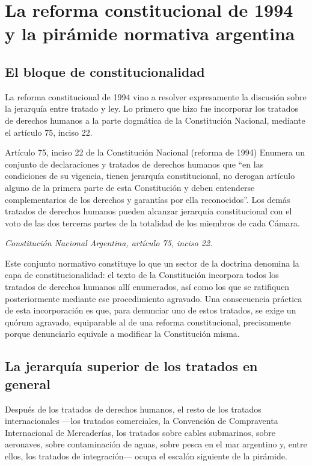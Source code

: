 \documentclass[12pt,oneside]{book}
\begin{document}
\section{La reforma constitucional de 1994 y la pirámide normativa argentina}

\subsection{El bloque de constitucionalidad}

La reforma constitucional de 1994 vino a resolver expresamente la discusión sobre la jerarquía entre tratado y ley. Lo primero que hizo fue incorporar los tratados de derechos humanos a la parte dogmática de la Constitución Nacional, mediante el artículo 75, inciso 22.

\begin{definition}{Artículo 75, inciso 22 de la Constitución Nacional (reforma de 1994)}
Enumera un conjunto de declaraciones y tratados de derechos humanos que ``en las condiciones de su vigencia, tienen jerarquía constitucional, no derogan artículo alguno de la primera parte de esta Constitución y deben entenderse complementarios de los derechos y garantías por ella reconocidos''. Los demás tratados de derechos humanos pueden alcanzar jerarquía constitucional con el voto de las dos terceras partes de la totalidad de los miembros de cada Cámara.

\textit{Constitución Nacional Argentina, artículo 75, inciso 22.}
\end{definition}

Este conjunto normativo constituye lo que un sector de la doctrina denomina la capa de constitucionalidad: el texto de la Constitución incorpora todos los tratados de derechos humanos allí enumerados, así como los que se ratifiquen posteriormente mediante ese procedimiento agravado. Una consecuencia práctica de esta incorporación es que, para denunciar uno de estos tratados, se exige un quórum agravado, equiparable al de una reforma constitucional, precisamente porque denunciarlo equivale a modificar la Constitución misma.

\subsection{La jerarquía superior de los tratados en general}

Después de los tratados de derechos humanos, el resto de los tratados internacionales —los tratados comerciales, la Convención de Compraventa Internacional de Mercaderías, los tratados sobre cables submarinos, sobre aeronaves, sobre contaminación de aguas, sobre pesca en el mar argentino y, entre ellos, los tratados de integración— ocupa el escalón siguiente de la pirámide.
\end{document}
